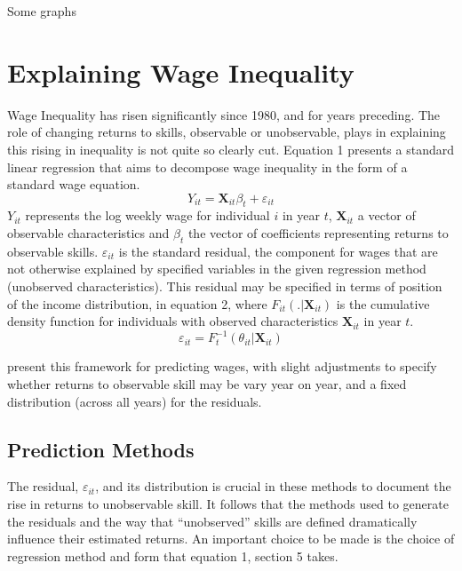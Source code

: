 \documentclass[notitlepage,12pt]{article}
\begin{document}
Some graphs

\section{Explaining Wage Inequality}

Wage Inequality has risen significantly since 1980, and for years preceding.  The role of changing returns to skills, observable or unobservable, plays in explaining this rising in inequality is not quite so clearly cut.  Equation 1 presents a standard linear regression that aims to decompose wage inequality in the form of a standard wage equation. 
\begin{equation}
Y_{it} = \mathbf{X}_{it}\beta_t + \varepsilon_{it}
\end{equation}
$Y_{it}$ represents the log weekly wage for individual $i$ in year $t$, $\mathbf{X}_{it}$ a vector of observable characteristics and $\beta_t$ the vector of coefficients representing returns to observable skills. $\varepsilon_{it}$ is the standard residual, the component for wages that are not otherwise explained by specified variables in the given regression method (unobserved characteristics).  This residual may be specified in terms of position of the income distribution, in equation 2, where $F_{it}(. | \mathbf{X}_{it})$ is the cumulative density function for individuals with observed characteristics $\mathbf{X}_{it}$ in year $t$.
\begin{equation}
\varepsilon_{it} = F_{t}^{-1}(\theta_{it} | \mathbf{X}_{it})
\end{equation}

\cite{juhn1993wage} present this framework for predicting wages, with slight adjustments to specify whether returns to observable skill may be vary year on year, and a fixed distribution (across all years) for the residuals.  

\subsection{Prediction Methods}
The residual, $\varepsilon_{it}$, and its distribution is crucial in these methods to document the rise in returns to unobservable skill.  It follows that the methods used to generate the residuals and the way that ``unobserved'' skills are defined dramatically influence their estimated returns.
An important choice to be made is the choice of regression method and form that equation 1, section 5 takes.
\end{document}
